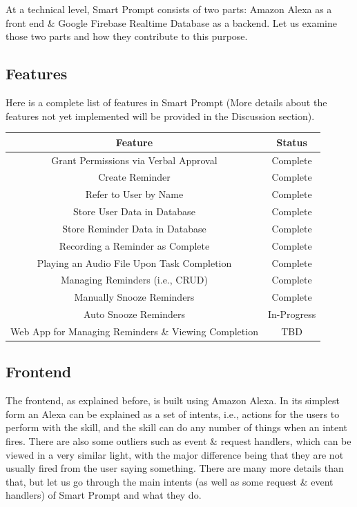 \documentclass[11pt, oneside]{article}
\begin{document}
At a technical level, Smart Prompt consists of two parts: Amazon Alexa as a front end \& Google Firebase Realtime Database as a backend. 
Let us examine those two parts and how they contribute to this purpose. 

\subsection{Features}

Here is a complete list of features in Smart Prompt (More details about the features not yet implemented will be provided in the Discussion section).
\begin{center}
\begin{tabular}{| c | c |}
 \hline
 Feature & Status \\ [0.5ex] 
 \hline\hline
 Grant Permissions via Verbal Approval & Complete \\
 \hline
 Create Reminder & Complete \\
 \hline
 Refer to User by Name & Complete \\
 \hline
 Store User Data in Database & Complete \\
 \hline
 Store Reminder Data in Database & Complete \\
 \hline
 Recording a Reminder as Complete & Complete \\
 \hline
 Playing an Audio File Upon Task Completion & Complete \\
 \hline
 Managing Reminders (i.e., CRUD) & Complete \\
 \hline
 Manually Snooze Reminders & Complete \\
 \hline
 Auto Snooze Reminders & In-Progress \\
 \hline
 Web App for Managing Reminders \& Viewing Completion & TBD \\
 \hline
\end{tabular}
\end{center}

\subsection{Frontend}

The frontend, as explained before, is built using Amazon Alexa. 
In its simplest form an Alexa can be explained as a set of intents, i.e., actions for the users to perform with the skill, and the skill can do any number of things when an intent fires. 
There are also some outliers such as event \& request handlers, which can be viewed in a very similar light, with the major difference being that they are not usually fired from the user saying something. 
There are many more details than that, but let us go through the main intents (as well as some request \& event handlers) of Smart Prompt and what they do. 
\end{document}
